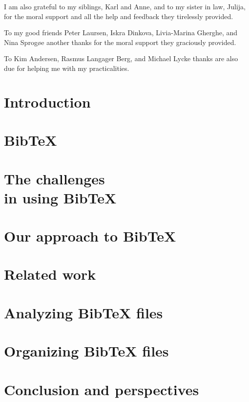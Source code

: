 \documentclass[twoside,11pt,openright,a4paper]{report}
\newcommand{\bibtex}{Bib{\TeX}}
\begin{document}
I am also grateful to my siblings, Karl and Anne, and to my sister in
law, Julija, for the moral support and all the help and feedback they
tirelessly provided.

To my good friends Peter Laursen, Iskra Dinkova, Livia-Marina
Gherghe, and Nina Sprogøe another thanks for the moral support they
graciously provided.

To Kim Andersen, Rasmus Langager Berg, and Michael Lycke thanks are
also due for helping me with my practicalities.


\tableofcontents
\newpage

\setcounter{secnumdepth}{2}


\chapter{Introduction}
\label{ch:intro}


\chapter{{\bibtex}}
\label{ch:about}


\chapter{The challenges\\in using {\bibtex}}
\label{ch:problem-description}


\chapter{Our approach to {\bibtex}}
\label{ch:approach}


\chapter{Related work}
\label{ch:related}


\chapter{Analyzing {\bibtex} files}
\label{ch:analyzing}


\chapter{Organizing {\bibtex} files}
\label{ch:organizing}


\chapter{Conclusion and perspectives}
\label{ch:conclusion}


\printbibliography{}
\end{document}
